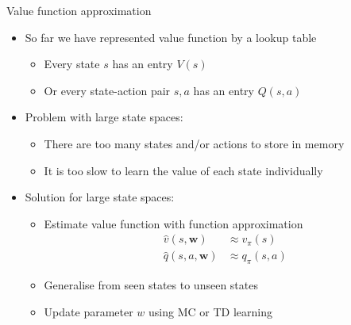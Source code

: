 \bgroup
\begin{frame}{Value function approximation}
\begin{itemize}
\item So far we have represented value function by a lookup table
\begin{itemize}
\item Every state $s$ has an entry $V(s)$
\item Or every state-action pair $s, a$ has an entry $Q(s, a)$
\end{itemize}
%
\item Problem with large state spaces:
\begin{itemize}
\item There are too many states and/or actions to store in memory
\item It is too slow to learn the value of each state individually
\end{itemize}
%
\item Solution for large state spaces:
\begin{itemize}
\item Estimate value function with function approximation
\begin{align*}
\hat{v}(s,\textbf{w}) &\approx v_{\pi}(s)\\
\hat{q}(s, a, \textbf{w}) &\approx q_{\pi}(s, a)
\end{align*}
\item Generalise from seen states to unseen states
\item Update parameter $w$ using MC or TD learning
\end{itemize}
\end{itemize}
\end{frame}
\egroup